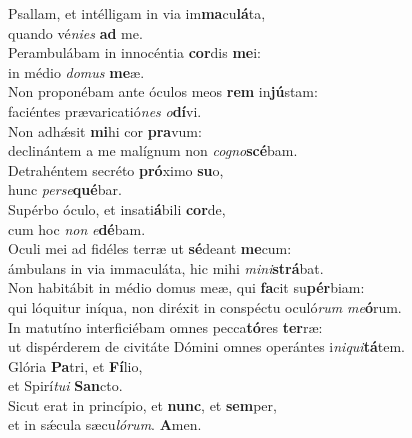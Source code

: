 \evenverse Psallam, et intélligam in via im\textbf{ma}cu\textbf{lá}ta,~\*\\
\evenverse quando vé\textit{ni}\textit{es} \textbf{ad} me.\\
\oddverse Perambulábam in innocéntia \textbf{cor}dis \textbf{me}i:~\*\\
\oddverse in médio \textit{do}\textit{mus} \textbf{me}æ.\\
\evenverse Non proponébam ante óculos meos \textbf{rem} in\textbf{jú}stam:~\*\\
\evenverse faciéntes prævaricatió\textit{nes} \textit{o}\textbf{dí}vi.\\
\oddverse Non adhǽsit \textbf{mi}hi cor \textbf{pra}vum:~\*\\
\oddverse declinántem a me malígnum non \textit{co}\textit{gno}\textbf{scé}bam.\\
\evenverse Detrahéntem secréto \textbf{pró}ximo \textbf{su}o,~\*\\
\evenverse hunc \textit{per}\textit{se}\textbf{qué}bar.\\
\oddverse Supérbo óculo, et insati\textbf{á}bili \textbf{cor}de,~\*\\
\oddverse cum hoc \textit{non} \textit{e}\textbf{dé}bam.\\
\evenverse Oculi mei ad fidéles terræ ut \textbf{sé}deant \textbf{me}cum:~\*\\
\evenverse ámbulans in via immaculáta, hic mihi \textit{mi}\textit{ni}\textbf{strá}bat.\\
\oddverse Non habitábit in médio domus meæ, qui \textbf{fa}cit su\textbf{pér}biam:~\*\\
\oddverse qui lóquitur iníqua, non diréxit in conspéctu oculó\textit{rum} \textit{me}\textbf{ó}rum.\\
\evenverse In matutíno interficiébam omnes pecca\textbf{tó}res \textbf{ter}ræ:~\*\\
\evenverse ut dispérderem de civitáte Dómini omnes operántes i\textit{ni}\textit{qui}\textbf{tá}tem.\\
\oddverse Glória \textbf{Pa}tri, et \textbf{Fí}lio,~\*\\
\oddverse et Spirí\textit{tu}\textit{i} \textbf{San}cto.\\
\evenverse Sicut erat in princípio, et \textbf{nunc}, et \textbf{sem}per,~\*\\
\evenverse et in sǽcula sæcu\textit{ló}\textit{rum}. \textbf{A}men.\\
